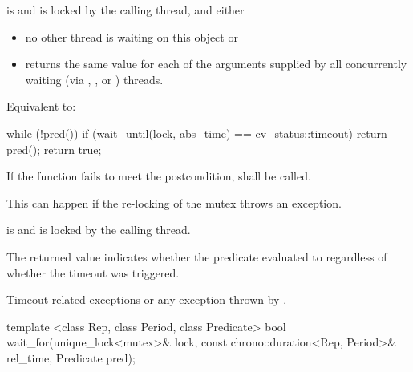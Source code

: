 \begin{itemdescr}
\pnum
\requires {} is  and  is
locked by the calling thread, and either

\begin{itemize}
\item no other thread is waiting on this  object or
\item {} returns the same value for each of the 
arguments supplied by all concurrently waiting (via ,
, or ) threads.
\end{itemize}

\pnum
\effects Equivalent to:
\begin{codeblock}
while (!pred())
  if (wait_until(lock, abs_time) == cv_status::timeout)
    return pred();
return true;
\end{codeblock}

\pnum
\remarks
If the function fails to meet the postcondition, 
shall be called.
\begin{note} This can happen if the re-locking of the mutex throws an exception. \end{note}

\pnum
\postconditions {} is  and 
is locked by the calling thread.

\pnum
\begin{note} The returned value indicates whether the predicate evaluated to
 regardless of whether the timeout was triggered. \end{note}

\pnum
\throws Timeout-related
exceptions or any exception thrown by .

\end{itemdescr}

%
\begin{itemdecl}
template <class Rep, class Period, class Predicate>
  bool wait_for(unique_lock<mutex>& lock,
                const chrono::duration<Rep, Period>& rel_time,
                Predicate pred);
\end{itemdecl}


